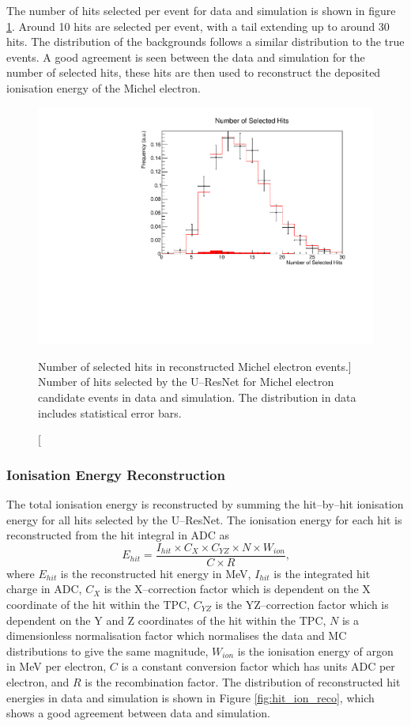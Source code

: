 The number of hits selected per event for data and simulation is shown in 
figure \ref{fig:mich_n_hits}. Around 10 hits are selected per event, with a 
tail extending up to around 30 hits. The distribution of the backgrounds 
follows a similar distribution to the true events. A good agreement is seen 
between the data and simulation for the number of selected hits, these hits 
are then used to reconstruct the deposited ionisation energy of the Michel
electron.
\begin{figure}
	\centering
	\includegraphics[width=\textwidth]{figures/mich_n_hits.pdf}
	\caption
	[Number of selected hits in reconstructed Michel electron events.]
	{Number of hits selected by the U--ResNet for Michel electron candidate 
	events in data and simulation. The distribution in data includes statistical
	error bars.}
	\label{fig:mich_n_hits}
\end{figure}

\subsubsection{Ionisation Energy Reconstruction}

The total ionisation energy is reconstructed by summing the hit--by--hit
ionisation energy for all hits selected by the U--ResNet. The ionisation energy for
each hit is reconstructed from the hit integral in ADC as 
\begin{equation*}
	E_{hit} = \frac{I_{hit} \times C_X \times C_{YZ} \times N \times W_{ion}}{C \times R}\mbox{,}
\end{equation*}
where $E_{hit}$ is the reconstructed hit energy in MeV, $I_{hit}$ is the
integrated hit charge in ADC, $C_X$ is the X--correction factor which is
dependent on the X coordinate of the hit within the TPC, $C_{YZ}$ is the 
YZ--correction factor which is dependent on the Y and Z coordinates 
of the hit within the TPC, $N$ is a dimensionless normalisation factor which
normalises the data and MC distributions to give the same magnitude, $W_{ion}$
is the ionisation energy of argon in MeV per electron, $C$ is a constant
conversion factor which has units ADC per electron, and $R$ is the
recombination factor. The distribution of reconstructed hit energies in
\protodune{} data and simulation is shown in Figure \ref{fig:hit_ion_reco},
which shows a good agreement between data and simulation.

